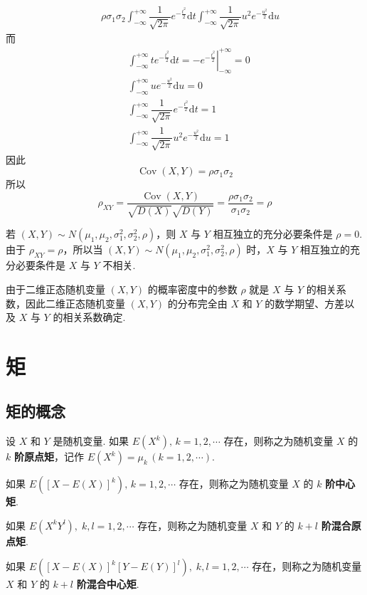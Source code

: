 \begin{myproof}
$$\begin{aligned}
        & \; \rho \sigma_1 \sigma_2 \int_{-\infty}^{+\infty} \dfrac{1}{\sqrt{2 \pi}} e^{-\frac{t^2}{2}} \text{d}t \int_{-\infty}^{+\infty} \dfrac{1}{\sqrt{2 \pi}} u^2 e^{-\frac{u^2}{2}} \text{d}u
    \end{aligned}
    $$
    而
    $$
    \begin{aligned}
        & \int_{-\infty}^{+\infty} t e^{-\frac{t^2}{2}} \text{d}t = \left. -e^{-\frac{t^2}{2}} \right|_{-\infty}^{+\infty} = 0 \\
        & \int_{-\infty}^{+\infty} u e^{-\frac{u^2}{2}} \text{d}u = 0 \\
        & \int_{-\infty}^{+\infty} \dfrac{1}{\sqrt{2 \pi}} e^{-\frac{t^2}{2}} \text{d}t = 1 \\
        & \int_{-\infty}^{+\infty} \dfrac{1}{\sqrt{2 \pi}} u^2 e^{-\frac{u^2}{2}} \text{d}u = 1
    \end{aligned}
    $$
    因此
    $$
    \operatorname{Cov}(X,Y) = \rho \sigma_1 \sigma_2
    $$
    所以
    $$
    \rho_{XY} = \dfrac{\operatorname{Cov}(X,Y)}{\sqrt{D(X)} \sqrt{D(Y)}} = \dfrac{\rho \sigma_1 \sigma_2}{\sigma_1 \sigma_2} = \rho
    $$
\end{myproof}

若 $(X,Y) \sim N(\mu_1,\mu_2,\sigma_1^2,\sigma_2^2,\rho)$，则 $X$ 与 $Y$ 相互独立的充分必要条件是 $\rho=0$. 由于 $\rho_{XY} = \rho$，所以当 $(X,Y) \sim N(\mu_1,\mu_2,\sigma_1^2,\sigma_2^2,\rho)$ 时，$X$ 与 $Y$ 相互独立的充分必要条件是 $X$ 与 $Y$ 不相关.

由于二维正态随机变量 $(X,Y)$ 的概率密度中的参数 $\rho$ 就是 $X$ 与 $Y$ 的相关系数，因此二维正态随机变量 $(X,Y)$ 的分布完全由 $X$ 和 $Y$ 的数学期望、方差以及 $X$ 与 $Y$ 的相关系数确定.

\section{矩}

\subsection{矩的概念}

\begin{definition}
    设 $X$ 和 $Y$ 是随机变量. 如果 $E(X^k), \, k=1,2,\cdots$ 存在，则称之为随机变量 $X$ 的 $k$ \textbf{阶原点矩}，记作 $E(X^k) = \mu_k \, (k=1,2,\cdots)$.

    如果 $E([X-E(X)]^k), \, k=1,2,\cdots$ 存在，则称之为随机变量 $X$ 的 $k$ \textbf{阶中心矩}.

    如果 $E(X^k Y^l), \; k,l=1,2,\cdots$ 存在，则称之为随机变量 $X$ 和 $Y$ 的 $k+l$ \textbf{阶混合原点矩}.

    如果 $E([X-E(X)]^k [Y-E(Y)]^l), \; k,l=1,2,\cdots$ 存在，则称之为随机变量 $X$ 和 $Y$ 的 $k+l$ \textbf{阶混合中心矩}.
\end{definition}

